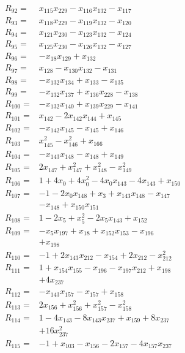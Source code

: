 \begin{align*}
R_{92}={}&x_{115}x_{229} -x_{116}x_{132} -x_{117}\\[3pt]
R_{93}={}&x_{118}x_{229} -x_{119}x_{132} -x_{120}\\[3pt]
R_{94}={}&x_{121}x_{230} -x_{123}x_{132} -x_{124}\\[3pt]
R_{95}={}&x_{125}x_{230} -x_{126}x_{132} -x_{127}\\[3pt]
R_{96}={}&-x_{18}x_{129} +x_{132}\\[3pt]
R_{97}={}&x_{128} -x_{130}x_{132} -x_{131}\\[3pt]
R_{98}={}&-x_{132}x_{134} +x_{133} -x_{135}\\[3pt]
R_{99}={}&-x_{132}x_{137} +x_{136}x_{228} -x_{138}\\[3pt]
R_{100}={}&-x_{132}x_{140} +x_{139}x_{229} -x_{141}\\[3pt]
R_{101}={}&x_{142} -2x_{142}x_{144} +x_{145}\\[3pt]
R_{102}={}&-x_{142}x_{145} -x_{145} +x_{146}\\[3pt]
R_{103}={}&x_{145}^{2} -x_{146}^{2} +x_{166}\\[3pt]
R_{104}={}&-x_{143}x_{148} -x_{148} +x_{149}\\[3pt]
R_{105}={}&2x_{147} +x_{147}^{2} +x_{148}^{2} -x_{149}^{2}\\[3pt]
R_{106}={}&1 +4x_{0} +4x_{0}^{2} -4x_{0}x_{143} -4x_{143} +x_{150}\\[3pt]
R_{107}={}&-1 -2x_{0}x_{148} +x_{3} +x_{143}x_{148} -x_{147}\\
&-x_{148} +x_{150}x_{151}\\[3pt]
R_{108}={}&1 -2x_{5} +x_{5}^{2} -2x_{5}x_{143} +x_{152}\\[3pt]
R_{109}={}&-x_{5}x_{197} +x_{18} +x_{152}x_{153} -x_{196}\\
&+x_{198}\\[3pt]
R_{110}={}&-1 +2x_{143}x_{212} -x_{154} +2x_{212} -x_{212}^{2}\\[3pt]
R_{111}={}&1 +x_{154}x_{155} -x_{196} -x_{197}x_{212} +x_{198}\\
&+4x_{237}\\[3pt]
R_{112}={}&-x_{143}x_{157} -x_{157} +x_{158}\\[3pt]
R_{113}={}&2x_{156} +x_{156}^{2} +x_{157}^{2} -x_{158}^{2}\\[3pt]
R_{114}={}&1 -4x_{143} -8x_{143}x_{237} +x_{159} +8x_{237}\\
&+16x_{237}^{2}\\[3pt]
R_{115}={}&-1 +x_{103} -x_{156} -2x_{157} -4x_{157}x_{237}\\

\end{align*}
